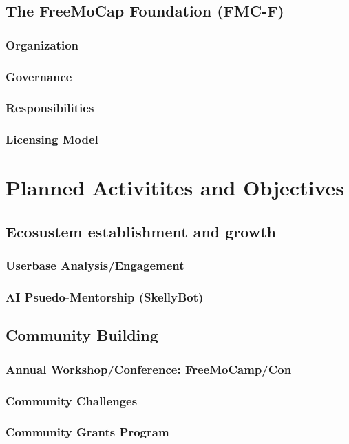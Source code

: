 \documentclass[11pt]{article}
\begin{document}
\subsection{The FreeMoCap Foundation (FMC-F)}
\subsubsection{Organization}
\subsubsection{Governance}
\subsubsection{Responsibilities}
\subsubsection{Licensing Model}

\section{Planned Activitites and Objectives}

\subsection{Ecosustem establishment and growth}
\subsubsection{Userbase Analysis/Engagement}
\subsubsection{AI Psuedo-Mentorship (SkellyBot)}

\subsection{Community Building}
\subsubsection{Annual Workshop/Conference: FreeMoCamp/Con}
\subsubsection{Community Challenges}
\subsubsection{Community Grants Program}
\end{document}
